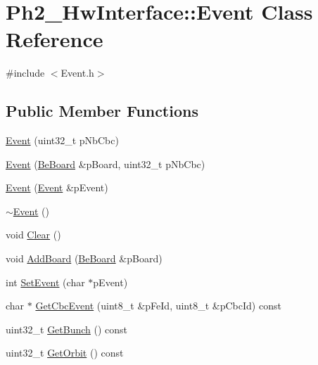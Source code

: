 \hypertarget{class_ph2___hw_interface_1_1_event}{\section{Ph2\-\_\-\-Hw\-Interface\-:\-:Event Class Reference}
\label{class_ph2___hw_interface_1_1_event}
}


{\ttfamily \#include $<$Event.\-h$>$}

\subsection*{Public Member Functions}
\begin{DoxyCompactItemize}
\item 
\hyperlink{class_ph2___hw_interface_1_1_event_a76e38e4a345ed8cac86579821efe9b73}{Event} (uint32\-\_\-t p\-Nb\-Cbc)
\item 
\hyperlink{class_ph2___hw_interface_1_1_event_a75a7e673a29d9cca0080c5517895d838}{Event} (\hyperlink{class_ph2___hw_description_1_1_be_board}{Be\-Board} \&p\-Board, uint32\-\_\-t p\-Nb\-Cbc)
\item 
\hyperlink{class_ph2___hw_interface_1_1_event_a3f676bea23859e6417f1ccbade7308df}{Event} (\hyperlink{class_ph2___hw_interface_1_1_event}{Event} \&p\-Event)
\item 
\hyperlink{class_ph2___hw_interface_1_1_event_a2698d395adfcd65d0853676a899127fc}{$\sim$\-Event} ()
\item 
void \hyperlink{class_ph2___hw_interface_1_1_event_ac324585a7a75fb07c51e71317e53ea64}{Clear} ()
\item 
void \hyperlink{class_ph2___hw_interface_1_1_event_a41a2aae19c78d908c738163e56f1be0b}{Add\-Board} (\hyperlink{class_ph2___hw_description_1_1_be_board}{Be\-Board} \&p\-Board)
\item 
int \hyperlink{class_ph2___hw_interface_1_1_event_a67bf8cfaeaec158907932be40b37601d}{Set\-Event} (char $\ast$p\-Event)
\item 
char $\ast$ \hyperlink{class_ph2___hw_interface_1_1_event_a2ee5e2552a84cb78ae902436e0dd77f4}{Get\-Cbc\-Event} (uint8\-\_\-t \&p\-Fe\-Id, uint8\-\_\-t \&p\-Cbc\-Id) const 
\item 
uint32\-\_\-t \hyperlink{class_ph2___hw_interface_1_1_event_ab577a18ce8a9edc17debb67ea8734530}{Get\-Bunch} () const 
\item 
uint32\-\_\-t \hyperlink{class_ph2___hw_interface_1_1_event_a02d8bec5f5249cb80e2835e8aff037d7}{Get\-Orbit} () const 

\end{DoxyCompactItemize}
